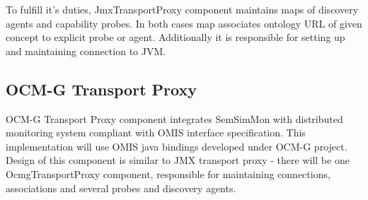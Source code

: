To fulfill it's duties, JmxTransportProxy component maintains maps of discovery agents and capability probes. In both
cases map associates ontology URL of given concept to explicit probe or agent. Additionally it is responsible for
setting up and maintaining connection to JVM.


\subsection{OCM-G Transport Proxy}

OCM-G Transport Proxy component integrates SemSimMon with distributed monitoring system compliant with OMIS interface
specification. This implementation will use OMIS java bindings developed under OCM-G project. Design of this component
is similar to JMX transport proxy - there will be one OcmgTransportProxy component, responsible for maintaining
connections, associations and several probes and discovery agents.


